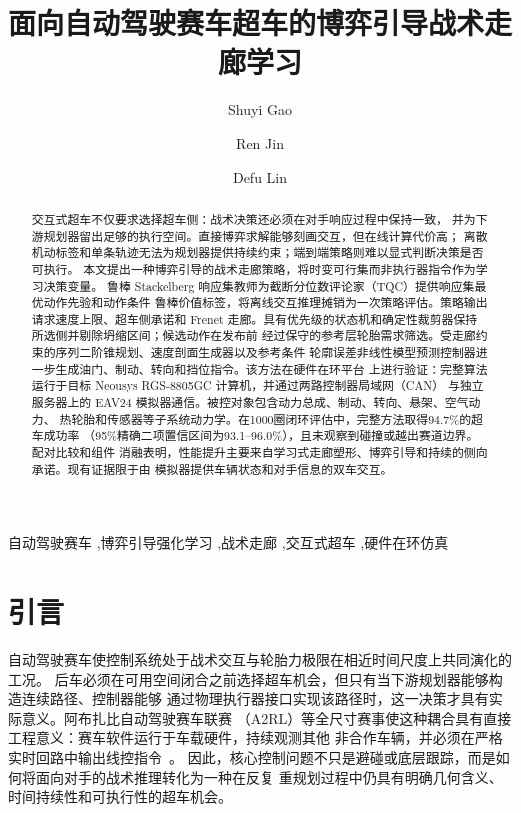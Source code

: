 \documentclass[final,5p,twocolumn]{elsarticle}
\begin{document}
\begin{frontmatter}

\title{面向自动驾驶赛车超车的博弈引导战术走廊学习}

\author[bit]{Shuyi Gao}
\author[bit]{Ren Jin}
\author[bit]{Defu Lin}


\begin{abstract}
交互式超车不仅要求选择超车侧：战术决策还必须在对手响应过程中保持一致，
并为下游规划器留出足够的执行空间。直接博弈求解能够刻画交互，但在线计算代价高；
离散机动标签和单条轨迹无法为规划器提供持续约束；端到端策略则难以显式判断决策是否可执行。
本文提出一种博弈引导的战术走廊策略，将时变可行集而非执行器指令作为学习决策变量。
鲁棒 Stackelberg 响应集教师为截断分位数评论家（TQC）提供响应集最优动作先验和动作条件
鲁棒价值标签，将离线交互推理摊销为一次策略评估。策略输出请求速度上限、超车侧承诺和
Frenet 走廊。具有优先级的状态机和确定性裁剪器保持所选侧并剔除坍缩区间；候选动作在发布前
经过保守的参考层轮胎需求筛选。受走廊约束的序列二阶锥规划、速度剖面生成器以及参考条件
轮廓误差非线性模型预测控制器进一步生成油门、制动、转向和挡位指令。该方法在硬件在环平台
上进行验证：完整算法运行于目标 Neousys RGS-8805GC 计算机，并通过两路控制器局域网（CAN）
与独立服务器上的 EAV24 模拟器通信。被控对象包含动力总成、制动、转向、悬架、空气动力、
热轮胎和传感器等子系统动力学。在1000圈闭环评估中，完整方法取得94.7\%的超车成功率
（95\%精确二项置信区间为93.1--96.0\%），且未观察到碰撞或越出赛道边界。配对比较和组件
消融表明，性能提升主要来自学习式走廊塑形、博弈引导和持续的侧向承诺。现有证据限于由
模拟器提供车辆状态和对手信息的双车交互。
\end{abstract}

\begin{keyword}
自动驾驶赛车 \sep 博弈引导强化学习 \sep 战术走廊
\sep 交互式超车 \sep 硬件在环仿真
\end{keyword}

\end{frontmatter}

\section{引言}
自动驾驶赛车使控制系统处于战术交互与轮胎力极限在相近时间尺度上共同演化的工况。
后车必须在可用空间闭合之前选择超车机会，但只有当下游规划器能够构造连续路径、控制器能够
通过物理执行器接口实现该路径时，这一决策才具有实际意义。阿布扎比自动驾驶赛车联赛
（A2RL）等全尺寸赛事使这种耦合具有直接工程意义：赛车软件运行于车载硬件，持续观测其他
非合作车辆，并必须在严格实时回路中输出线控指令~\cite{betz2022survey,hoffmann2026a2rl}。
因此，核心控制问题不只是避碰或底层跟踪，而是如何将面向对手的战术推理转化为一种在反复
重规划过程中仍具有明确几何含义、时间持续性和可执行性的超车机会。
\end{document}
